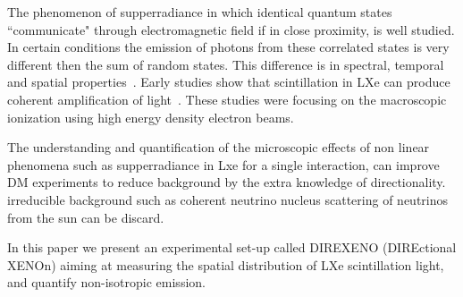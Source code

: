 The phenomenon of supperradiance in which identical quantum states ``communicate" through electromagnetic field if in close proximity, 
is well studied. In certain conditions the emission of photons from these correlated states is very different then the sum of random states. 
This difference is in spectral, temporal and spatial properties~\cite{DickeSR,GROSS1982301}. Early studies show that scintillation in LXe can 
produce coherent amplification of light~\cite{BasovSRTheory,MiesSRExp}. These studies were focusing on the macroscopic ionization using high 
energy density electron beams. 

The understanding and quantification of the microscopic effects of non linear phenomena such as supperradiance in Lxe for a single interaction, 
can improve DM experiments to reduce background by the extra knowledge of directionality. irreducible background such as coherent neutrino nucleus 
scattering of neutrinos from the sun can be discard.

In this paper we present an experimental set-up called DIREXENO (DIREctional XENOn)  aiming at measuring the spatial distribution of LXe scintillation 
light, and quantify non-isotropic emission.   
